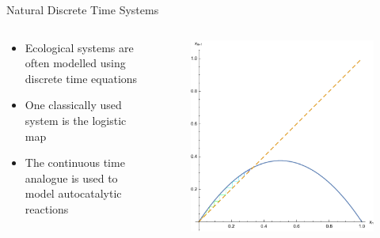 \documentclass{beamer}
\begin{document}
\begin{frame}{Natural Discrete Time Systems}
	\begin{columns}
		\begin{column}{0.5\textwidth}
			\begin{itemize}
					\item
						Ecological systems are often modelled using discrete time equations

					\item
						One classically used system is the logistic map\autocite{Maier2010}
					\item
						The continuous time analogue is used to model autocatalytic reactions
				\end{itemize}
		\end{column}
		\begin{column}{0.5\textwidth}
			\begin{figure}
				\centering
				\includegraphics[width=\textwidth]{logistic.pdf}
			\end{figure}
		\end{column}
	\end{columns}
\end{frame}
\end{document}
